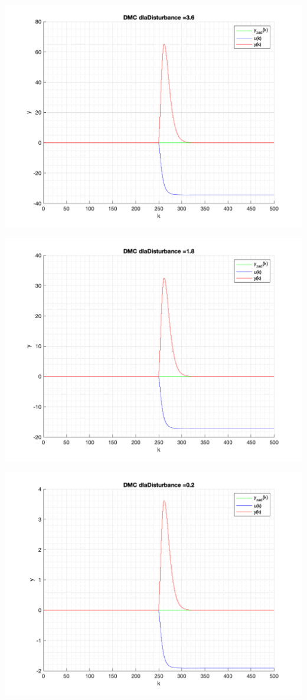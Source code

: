 \documentclass[a4paper, 11pt]{article}
\begin{document}
\begin{enumerate}
 \includegraphics[width=\linewidth]{./ModelsP4_Disturbance/P4_DMC_Disturbance_3_6_png.png} 
 
 \includegraphics[width=\linewidth]{./ModelsP4_Disturbance/P4_DMC_Disturbance_1_8_png.png} 
 
 \includegraphics[width=\linewidth]{./ModelsP4_Disturbance/P4_DMC_Disturbance_0_2_png.png} 
 

\end{enumerate}
\end{document}
